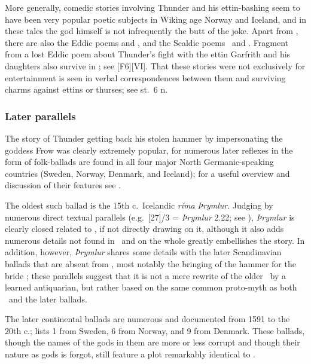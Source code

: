 More generally, comedic stories involving Thunder and his ettin-bashing seem to have been very popular poetic subjects in Wiking age Norway and Iceland, and in these tales the god himself is not infrequently the butt of the joke.  Apart from \Thrymskvida, there are also the Eddic poems  and , and the Scaldic poems \Haustlong\ and \Thorsdrapa.  Fragment from a lost Eddic poem about Thunder’s fight with the ettin Garfrith and his daughters also survive in \Gylfaginning; see [F6][VI].  That these stories were not exclusively for entertainment is seen in verbal correspondences between them and surviving charms against ettins or thurses; see st.~6 n.

\subsubsection{Later parallels}

The story of Thunder getting back his stolen hammer by impersonating the goddess Frow was clearly extremely popular, for numerous later reflexes in the form of folk-ballads are found in all four major North Germanic-speaking countries (Sweden, Norway, Denmark, and Iceland); for a useful overview and discussion of their features see \textcite{Vijunas2019}.

The oldest such ballad is the 15th c.~Icelandic \emph{ríma} \emph{Þrymlur}.  Judging by numerous direct textual parallels (e.g.~[27]/3 = \emph{Þrymlur} 2.22; see \cite[46--47,54]{Vijunas2019}), \emph{Þrymlur} is clearly closed related to \Thrymskvida, if not directly drawing on it, although it also adds numerous details not found in \Thrymskvida\ and on the whole greatly embellishes the story.
In addition, however, \emph{Þrymlur} shares some details with the later Scandinavian ballads that are absent from \Thrymskvida, most notably the bringing of the hammer for the bride \parencite[57--58]{Vijunas2019}; these parallels suggest that it is not a mere rewrite of the older \Thrymskvida\ by a learned antiquarian, but rather based on the same common proto-myth as both \Thrymskvida\ and the later ballads.

The later continental ballads are numerous and documented from 1591 to the 20th c.; \textcite[43--44]{Vijunas2019} lists 1 from Sweden, 6 from Norway, and 9 from Denmark.  These ballads, though the names of the gods in them are more or less corrupt and though their nature as gods is forgot, still feature a plot remarkably identical to \Thrymskvida.

